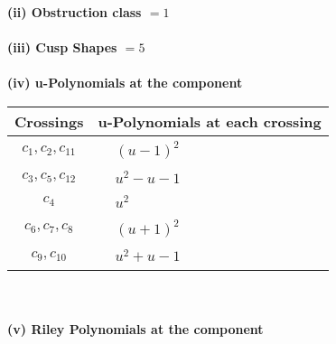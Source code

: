 \documentclass[1p]{elsarticle_modified}
\theoremstyle{definition}
\begin{document}
\flushleft \textbf{(ii) Obstruction class $= 1$}\\~\\
\flushleft \textbf{(iii) Cusp Shapes $= 5$}\\~\\
\newpage\renewcommand{\arraystretch}{1}
\flushleft \textbf{(iv) u-Polynomials at the component}\newline \\
\begin{tabular}{m{50pt}|m{274pt}}
Crossings & \hspace{64pt}u-Polynomials at each crossing \\
\hline $$\begin{aligned}c_{1},c_{2},c_{11}\end{aligned}$$&$\begin{aligned}
&(u-1)^2
\end{aligned}$\\
\hline $$\begin{aligned}c_{3},c_{5},c_{12}\end{aligned}$$&$\begin{aligned}
&u^2- u-1
\end{aligned}$\\
\hline $$\begin{aligned}c_{4}\end{aligned}$$&$\begin{aligned}
&u^2
\end{aligned}$\\
\hline $$\begin{aligned}c_{6},c_{7},c_{8}\end{aligned}$$&$\begin{aligned}
&(u+1)^2
\end{aligned}$\\
\hline $$\begin{aligned}c_{9},c_{10}\end{aligned}$$&$\begin{aligned}
&u^2+u-1
\end{aligned}$\\
\hline
\end{tabular}\\~\\
\newpage\renewcommand{\arraystretch}{1}
\flushleft \textbf{(v) Riley Polynomials at the component}\newline \\
\end{document}
